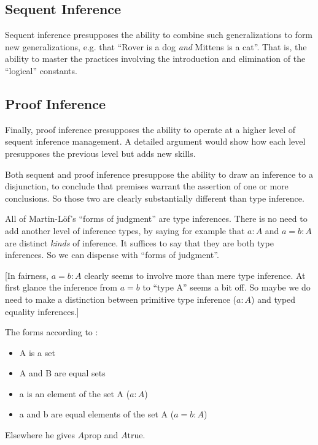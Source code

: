 \documentclass{article}
\begin{document}
\subsection{Sequent Inference}
Sequent inference presupposes the ability to combine such
generalizations to form new generalizations, e.g. that ``Rover is a
dog \textit{and} Mittens is a cat''. That is, the ability to master
the practices involving the introduction and elimination of the
``logical'' constants.

\subsection{Proof Inference}
Finally, proof inference presupposes the ability to operate at a higher
level of sequent inference management. A detailed argument would show
how each level presupposes the previous level but adds new skills.

Both sequent and proof inference presuppose the ability to draw an
inference to a disjunction, to conclude that premises warrant the
assertion of one or more conclusions. So those two are clearly
substantially different than type inference.


All of Martin-Löf's ``forms of judgment'' are type inferences. There
is no need to add another level of inference types, by saying for
example that \mbox{\(a:A\)} and \mbox{\(a=b:A\)} are distinct
\textit{kinds} of inference. It suffices to say that they are both
type inferences. So we can dispense with ``forms of judgment''.

[In fairness, \(a=b:A\) clearly seems to involve more than mere type
  inference. At first glance the inference from \(a=b\) to ``type A''
  seems a bit off. So maybe we do need to make a distinction between
  primitive type inference (\(a:A\)) and typed equality inferences.]


The forms according to  \parencite{martin1984intuitionistic}:

\begin{itemize}
\item A is a set
\item A and B are equal sets
\item a is an element of the set A  (\(a:A\))
\item a and b are equal elements of the set A (\(a=b:A\))
\end{itemize}

Elsewhere he gives \(A \text{prop}\) and \(A \text{true}\).
\end{document}
